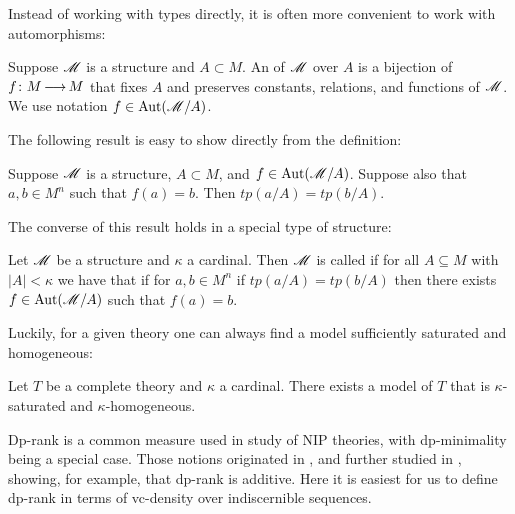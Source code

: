 Instead of working with types directly, it is often more convenient to work with automorphisms:
\begin{Definition}
  Suppose $\mathscr M$ is a structure and $A \subset M$.
  An  of $\mathscr M$ over $A$ is a bijection of $f \colon M \operatorname{\longrightarrow} M$
  that fixes $A$ and preserves constants, relations, and functions of $\mathscr M$.
  We use notation $f \in \operatorname{Aut}(\mathscr M/A)$.
\end{Definition}

The following result is easy to show directly from the definition:
\begin{Lemma} 
  Suppose $\mathscr M$ is a structure, $A \subset M$, and $f \in \operatorname{Aut}(\mathscr M/A)$.
  Suppose also that $a,b \in M^n$ such that $f(a) = b$.
  Then $tp(a/A) = tp(b/A)$.
\end{Lemma}

The converse of this result holds in a special type of structure:
\begin{Definition}
  Let $\mathscr M$ be a structure and $\kappa$ a cardinal.
  Then $\mathscr M$ is called  if for all $A \subseteq M$ with $|A| < \kappa$
  we have that if for $a, b \in M^n$ if $tp(a/A) = tp(b/A)$ then
  there exists $f \in \operatorname{Aut}(\mathscr M/A)$ such that $f(a) = b$.
\end{Definition}

Luckily, for a given theory one can always find a model sufficiently saturated and homogeneous:
\begin{Lemma} 
  Let $T$ be a complete theory and $\kappa$ a cardinal.
  There exists a model of $T$ that is $\kappa$-saturated and $\kappa$-homogeneous.
\end{Lemma}




Dp-rank is a common measure used in study of NIP theories, with dp-minimality being a special case.
Those notions originated in \cite{shelah_dp}, and further studied in \cite{dp_add}, showing, for example, that dp-rank is additive.
Here it is easiest for us to define dp-rank in terms of vc-density over indiscernible sequences.

